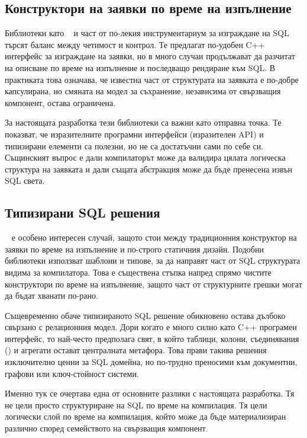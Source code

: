 \subsection{Конструктори на заявки по време на изпълнение}

Библиотеки като ~\cite{soci} и част от по-лекия инструментариум за изграждане на SQL търсят баланс между четимост и контрол. Те предлагат по-удобен C++ интерфейс за изграждане на заявки, но в много случаи продължават да разчитат на описване по време на изпълнение и последващо рендиране към SQL. В практиката това означава, че известна част от структурата на заявката е по-добре капсулирана, но смяната на модел за съхранение, независима от свързващия компонент, остава ограничена.

За настоящата разработка тези библиотеки са важни като отправна точка. Те показват, че изразителните програмни интерфейси (изразителен API) и типизирани елементи са полезни, но не са достатъчни сами по себе си. Същинският въпрос е дали компилаторът може да валидира цялата логическа структура на заявката и дали същата абстракция може да бъде пренесена извън SQL света.

\subsection{Типизирани SQL решения}

~\cite{sqlpp11} е особено интересен случай, защото стои между традиционния конструктор на заявки по време на изпълнение и по-строго статичния дизайн. Подобни библиотеки използват шаблони и типове, за да направят част от SQL структурата видима за компилатора. Това е съществена стъпка напред спрямо чистите конструктори по време на изпълнение, защото част от структурните грешки могат да бъдат хванати по-рано.

Същевременно обаче типизираното SQL решение обикновено остава дълбоко свързано с релационния модел. Дори когато е много силно като C++ програмен интерфейс, то най-често предполага свят, в който таблици, колони, съединявания () и агрегати остават централната метафора. Това прави такива решения изключително ценни за SQL домейна, но по-трудно преносими към документни, графови или ключ-стойност системи.

Именно тук се очертава една от основните разлики с настоящата разработка. Тя не цели просто структуриране на SQL по време на компилация. Тя цели логически слой по време на компилация, който може да бъде материализиран различно според семейството на свързващия компонент.

